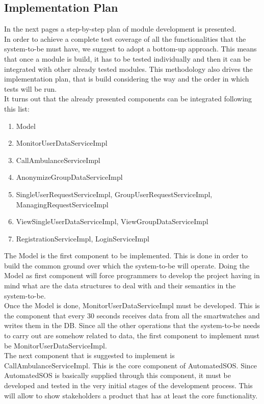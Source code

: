 \documentclass{article}
\begin{document}
\subsection{Implementation Plan}
In the next pages a step-by-step plan of module development is presented. \\
In order to achieve a complete test coverage of all the functionalities that the system-to-be must have, we suggest to adopt a bottom-up approach. This means that once a module is build, it has to be tested individually and then it can be integrated with other already tested modules. This methodology also drives the implementation plan, that is build considering the way and the order in which tests will be run.\\ It turns out that the already presented components can be integrated following this list: 
\begin{enumerate}
\item Model 
\item MonitorUserDataServiceImpl
\item CallAmbulanceServiceImpl
\item AnonymizeGroupDataServiceImpl
\item SingleUserRequestServiceImpl, GroupUserRequestServiceImpl, ManagingRequestServiceImpl
\item ViewSingleUserDataServiceImpl, ViewGroupDataServiceImpl
\item RegistrationServiceImpl, LoginServiceImpl
\end{enumerate}
The Model is the first component to be implemented. This is done in order to build the common ground over which the system-to-be will operate. Doing the Model as first component will force programmers to develop the project having in mind what are the data structures to deal with and their semantics in the system-to-be. \\
Once the Model is done, MonitorUserDataServiceImpl must be developed. This is the component that every 30 seconds receives data from all the smartwatches and writes them in the DB. Since all the other operations that the system-to-be needs to carry out are somehow related to data, the first component to implement must be MonitorUserDataServiceImpl. \\
The next component that is suggested to implement is CallAmbulanceServiceImpl. This is the core component of AutomatedSOS. Since AutomatedSOS is basically supplied through this component, it must be developed and tested in the very initial stages of the development process. This will allow to show stakeholders a product that has at least the core functionality. \\
\end{document}
